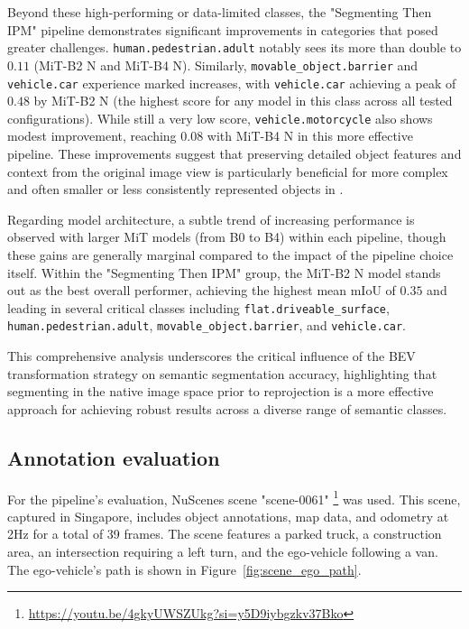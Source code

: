 Beyond these high-performing or data-limited classes, the "Segmenting Then IPM" pipeline demonstrates significant improvements in categories that posed greater challenges. \texttt{human.pedestrian.adult} notably sees its  more than double to $0.11$ (MiT-B2 N and MiT-B4 N). Similarly, \texttt{movable\_object.barrier} and \texttt{vehicle.car} experience marked increases, with \texttt{vehicle.car} achieving a peak of $0.48$ by MiT-B2 N (the highest score for any model in this class across all tested configurations). While still a very low score, \texttt{vehicle.motorcycle} also shows modest improvement, reaching $0.08$ with MiT-B4 N in this more effective pipeline. These improvements suggest that preserving detailed object features and context from the original image view is particularly beneficial for more complex and often smaller or less consistently represented objects in .

Regarding model architecture, a subtle trend of increasing performance is observed with larger MiT models (from B0 to B4) within each pipeline, though these gains are generally marginal compared to the impact of the pipeline choice itself. Within the "Segmenting Then IPM" group, the MiT-B2 N model stands out as the best overall performer, achieving the highest mean mIoU of $0.35$ and leading in several critical classes including \texttt{flat.driveable\_surface}, \texttt{human.pedestrian.adult}, \texttt{movable\_object.barrier}, and \texttt{vehicle.car}. 

This comprehensive analysis underscores the critical influence of the BEV transformation strategy on semantic segmentation accuracy, highlighting that segmenting in the native image space prior to reprojection is a more effective approach for achieving robust results across a diverse range of semantic classes.


\subsection{Annotation evaluation}
For the pipeline's evaluation, NuScenes scene "scene-0061" \footnote{\url{https://youtu.be/4gkyUWSZUkg?si=y5D9iybgzkv37Bko}} was used. This scene, captured in Singapore, includes object annotations, map data, and odometry at 2Hz for a total of 39 frames. The scene features a parked truck, a construction area, an intersection requiring a left turn, and the ego-vehicle following a van. The ego-vehicle's path is shown in Figure~\ref{fig:scene_ego_path}.

